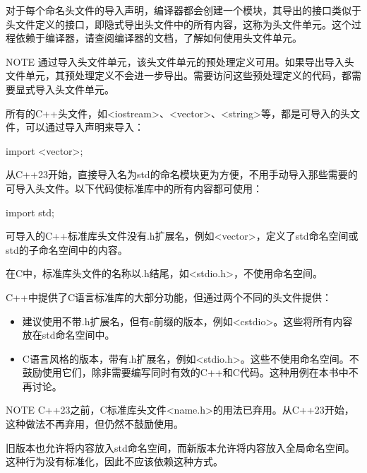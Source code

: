 对于每个命名头文件的导入声明，编译器都会创建一个模块，其导出的接口类似于头文件定义的接口，即隐式导出头文件中的所有内容，这称为头文件单元。这个过程依赖于编译器，请查阅编译器的文档，了解如何使用头文件单元。

\begin{myNotic}{NOTE}
通过导入头文件单元，该头文件单元的预处理定义可用。如果导出导入头文件单元，其预处理定义不会进一步导出。需要访问这些预处理定义的代码，都需要显式导入头文件单元。
\end{myNotic}


所有的C++头文件，如<iostream>、<vector>、<string>等，都是可导入的头文件，可以通过导入声明来导入：

\begin{cpp}
import <vector>;
\end{cpp}

从C++23开始，直接导入名为std的命名模块更为方便，不用手动导入那些需要的可导入头文件。以下代码使标准库中的所有内容都可使用：

\begin{cpp}
import std;
\end{cpp}

可导入的C++标准库头文件没有.h扩展名，例如<vector>，定义了std命名空间或std的子命名空间中的内容。

在C中，标准库头文件的名称以.h结尾，如<stdio.h>，不使用命名空间。

C++中提供了C语言标准库的大部分功能，但通过两个不同的头文件提供：

\begin{itemize}
\item
建议使用不带.h扩展名，但有c前缀的版本，例如<cstdio>。这些将所有内容放在std命名空间中。

\item
C语言风格的版本，带有.h扩展名，例如<stdio.h>。这些不使用命名空间。不鼓励使用它们，除非需要编写同时有效的C++和C代码。这种用例在本书中不再讨论。
\end{itemize}


\begin{myNotic}{NOTE}
C++23之前，C标准库头文件<name.h>的用法已弃用。从C++23开始，这种做法不再弃用，但仍然不鼓励使用。
\end{myNotic}

旧版本也允许将内容放入std命名空间，而新版本允许将内容放入全局命名空间。这种行为没有标准化，因此不应该依赖这种方式。

